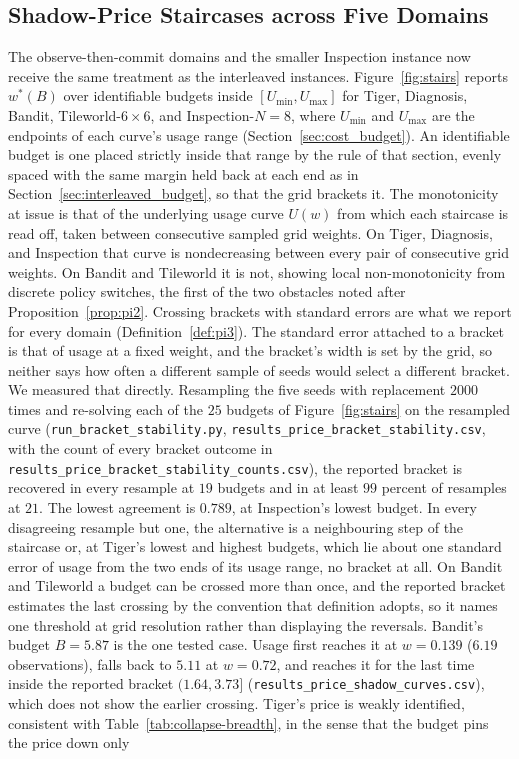 \subsection{Shadow-Price Staircases across Five Domains}
\label{sec:stairs}

The observe-then-commit domains and the smaller Inspection instance now receive the same treatment as the interleaved instances. Figure~\ref{fig:stairs} reports $w^*(B)$ over identifiable budgets inside $[U_{\min}, U_{\max}]$ for Tiger, Diagnosis, Bandit, Tileworld-$6{\times}6$, and Inspection-$N{=}8$, where $U_{\min}$ and $U_{\max}$ are the endpoints of each curve's usage range (Section~\ref{sec:cost_budget}). An identifiable budget is one placed strictly inside that range by the rule of that section, evenly spaced with the same margin held back at each end as in Section~\ref{sec:interleaved_budget}, so that the grid brackets it. The monotonicity at issue is that of the underlying usage curve $U(w)$ from which each staircase is read off, taken between consecutive sampled grid weights. On Tiger, Diagnosis, and Inspection that curve is nondecreasing between every pair of consecutive grid weights. On Bandit and Tileworld it is not, showing local non-monotonicity from discrete policy switches, the first of the two obstacles noted after Proposition~\ref{prop:pi2}. Crossing brackets with standard errors are what we report for every domain (Definition~\ref{def:pi3}). The standard error attached to a bracket is that of usage at a fixed weight, and the bracket's width is set by the grid, so neither says how often a different sample of seeds would select a different bracket. We measured that directly. Resampling the five seeds with replacement $2000$ times and re-solving each of the $25$ budgets of Figure~\ref{fig:stairs} on the resampled curve (\texttt{run\_\allowbreak bracket\_\allowbreak stability.py}, \texttt{results\_\allowbreak price\_\allowbreak bracket\_\allowbreak stability.csv}, with the count of every bracket outcome in \texttt{results\_\allowbreak price\_\allowbreak bracket\_\allowbreak stability\_\allowbreak counts.csv}), the reported bracket is recovered in every resample at $19$ budgets and in at least $99$ percent of resamples at $21$. The lowest agreement is $0.789$, at Inspection's lowest budget. In every disagreeing resample but one, the alternative is a neighbouring step of the staircase or, at Tiger's lowest and highest budgets, which lie about one standard error of usage from the two ends of its usage range, no bracket at all. On Bandit and Tileworld a budget can be crossed more than once, and the reported bracket estimates the last crossing by the convention that definition adopts, so it names one threshold at grid resolution rather than displaying the reversals. Bandit's budget $B{=}5.87$ is the one tested case. Usage first reaches it at $w{=}0.139$ ($6.19$ observations), falls back to $5.11$ at $w{=}0.72$, and reaches it for the last time inside the reported bracket $(1.64, 3.73]$ (\texttt{results\_\allowbreak price\_\allowbreak shadow\_\allowbreak curves.csv}), which does not show the earlier crossing. Tiger's price is weakly identified, consistent with Table~\ref{tab:collapse-breadth}, in the sense that the budget pins the price down only 